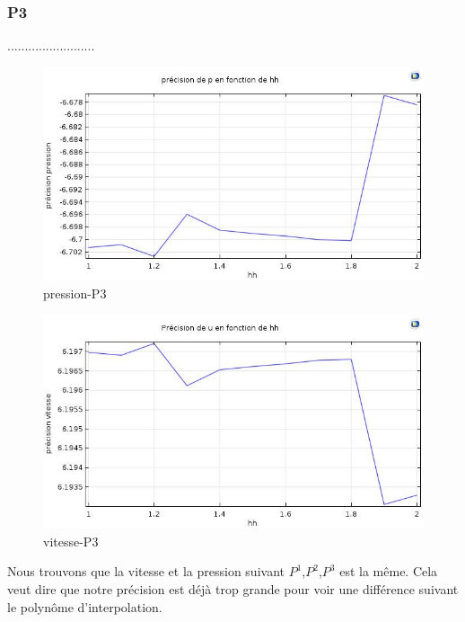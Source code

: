 \documentclass[a4paper,11pt]{report} %
\begin{document}
\subsubsection{P3}.........................

\begin{figure}[!h]
\centering
\hspace*{0mm}\vfill
\begin{center} \includegraphics[width=1.\textwidth]{pression_P3.jpg} \end{center}
\vfill\hspace*{0mm}
\caption{pression-P3 }
\label{v_ponctuel}
\end{figure}\pagebreak
\begin{figure}[!h]
\centering
\hspace*{0mm}\vfill
\begin{center} \includegraphics[width=1.\textwidth]{vitesse_u_P3.jpg} \end{center}
\vfill\hspace*{0mm}
\caption{vitesse-P3 }
\label{v_ponctuel}
\end{figure}
Nous trouvons que la vitesse et la pression suivant $P^1$,$P^2$,$P^3$ est la même. Cela veut dire que notre précision est déjà trop grande pour voir une différence suivant le polynôme d'interpolation.
\end{document}
